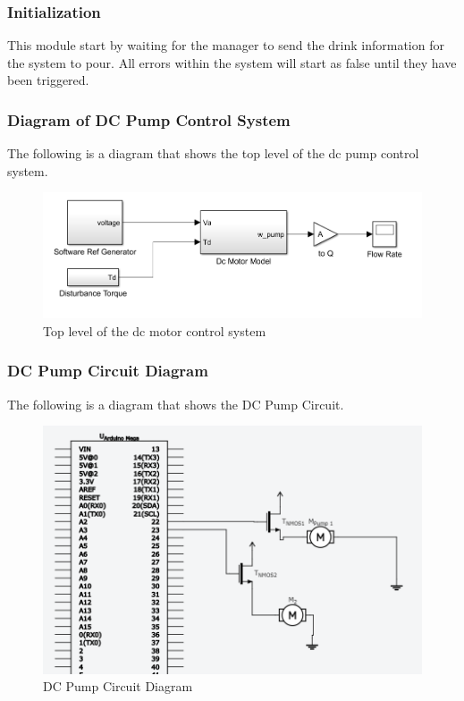 \documentclass [10pt]{article}
\begin{document}
\subsubsection{Initialization}
This module start by waiting for the manager to send the drink information for the system to pour. All errors within the system will start as false until they have been triggered.

\subsubsection{Diagram of DC Pump Control System}
The following is a diagram that shows the top level of the dc pump control system. 
\begin{figure} [h!]
	\centering
	\includegraphics [scale = 0.6] {Figures/DC_PumpSim.png}
	\caption{Top level of the dc motor control system}
\end{figure}

\subsubsection{DC Pump Circuit Diagram}
The following is a diagram that shows the DC Pump Circuit.
\begin{figure} [h!]
	\centering
	\includegraphics [scale = 0.6] {Figures/Pump.png}
	\caption{DC Pump Circuit Diagram}
\end{figure}
\end{document}
